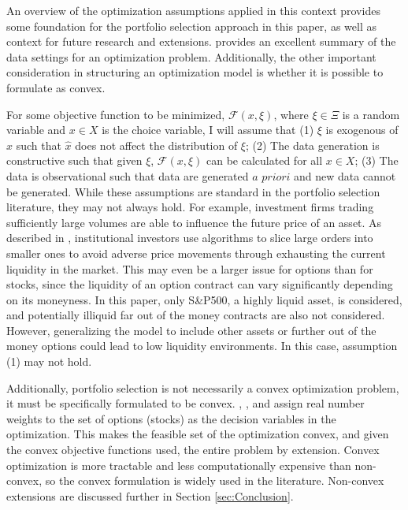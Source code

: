 
An overview of the optimization assumptions applied in this context provides some foundation for the portfolio selection approach in this paper, as well as context for future research and extensions. \cite{hannah2015stochastic} provides an excellent summary of the data settings for an optimization problem. Additionally, the other important consideration in structuring an optimization model is whether it is possible to formulate as convex.

For some objective function to be minimized, $\mathcal{F}(x, \xi)$, where $\xi \in \Xi$ is a random variable and $x \in X$ is the choice variable, I will assume that (1) $\xi$ is exogenous of $x$ such that $\hat{x}$ does not affect the distribution of $\xi$; (2) The data generation is constructive such that given $\xi$, $\mathcal{F}(x, \xi)$ can be calculated for all $x \in X$; (3) The data is observational such that data are generated $\textit{a priori}$ and new data cannot be generated. While these assumptions are standard in the portfolio selection literature, they may not always hold. For example, investment firms trading sufficiently large volumes are able to influence the future price of an asset. As described in \cite{gsell2008assessing}, institutional investors use algorithms to slice large orders into smaller ones to avoid adverse price movements through exhausting the current liquidity in the market. This may even be a larger issue for options than for stocks, since the liquidity of an option contract can vary significantly depending on its moneyness. In this paper, only S\&P500, a highly liquid asset, is considered, and potentially illiquid far out of the money contracts are also not considered. However, generalizing the model to include other assets or further out of the money options could lead to low liquidity environments. In this case, assumption (1) may not hold.

Additionally, portfolio selection is not necessarily a convex optimization problem, it must be specifically formulated to be convex. \cite{markowitz}, \cite{zhao2018markowitz}, and \cite{faias2017optimal} assign real number weights to the set of options (stocks) as the decision variables in the optimization. This makes the feasible set of the optimization convex, and given the convex objective functions used, the entire problem by extension. Convex optimization is more tractable and less computationally expensive than non-convex, so the convex formulation is widely used in the literature. Non-convex extensions are discussed further in Section \ref{sec:Conclusion}.

